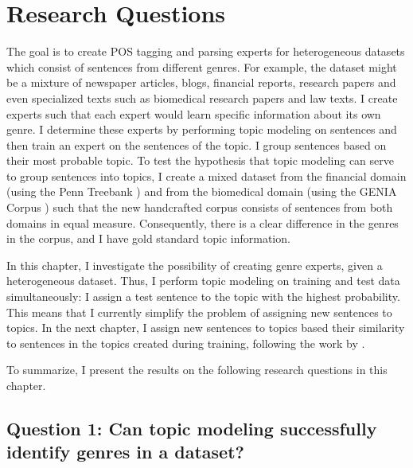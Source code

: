 \section{Research Questions}\label{sec:quest}

The goal is to create POS tagging and parsing experts for heterogeneous datasets which consist of  sentences from different genres. For example, the dataset might be a mixture of newspaper articles, blogs, financial reports, research papers and even specialized texts such as biomedical research papers and law texts. I create experts such that each expert would learn specific information about its own genre. I determine these experts by performing topic modeling on sentences and then train an expert on the sentences of the topic. I group sentences based on their most probable topic. To test the hypothesis that topic modeling can serve to group sentences into topics, I create a mixed dataset from the financial domain (using the Penn Treebank \cite{marcus:kim:ea:94}) and from the biomedical domain (using the GENIA Corpus \cite{tateisi:tsujii:04}) such that the new handcrafted corpus consists of sentences from both domains in equal measure. Consequently, there is a clear difference in the genres in the corpus, and I have gold standard topic information.

In this chapter, I investigate the possibility of creating genre experts, given a heterogeneous dataset. Thus, I perform topic modeling on training and test data simultaneously: I assign a test sentence to the topic with the highest probability. This means that I currently simplify the problem of assigning new sentences to topics. In the next chapter, I assign new sentences to topics based their similarity to sentences in the topics created during training, following the work by \citep{plank2011effective}. 

To summarize, I present the results on the following research questions in this chapter.

\subsection*{Question 1: Can topic modeling successfully identify genres in a dataset?} \label{q1}


